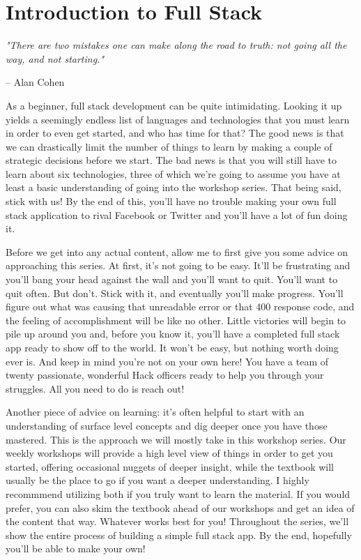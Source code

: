 \setchapterpreamble[u]{\margintoc}

\chapter{Introduction to Full Stack}

\epigraph{\emph{"There are two mistakes one can make along the road to truth: not going all the way, and not starting."}}{ -- Alan Cohen}

As a beginner, full stack development can be quite intimidating. Looking it up yields a seemingly endless list of languages and technologies that you must learn in order to even get started, and who has time for that? The good news is that we can drastically limit the number of things to learn by making a couple of strategic decisions before we start. The bad news is that you will still have to learn about six technologies, three of which we're going to assume you have at least a basic understanding of going into the workshop series. That being said, stick with us! By the end of this, you'll have no trouble making your own full stack application to rival Facebook or Twitter and you'll have a lot of fun doing it. 

Before we get into any actual content, allow me to first give you some advice on approaching this series. At first, it's not going to be easy. It'll be frustrating and you'll bang your head against the wall and you'll want to quit. You'll want to quit often. But don't. Stick with it, and eventually you'll make progress. You'll figure out what was causing that unreadable error or that 400 response code, and the feeling of accomplishment will be like no other. Little victories will begin to pile up around you and, before you know it, you'll have a completed full stack app ready to show off to the world. It won't be easy, but nothing worth doing ever is. And keep in mind you're not on your own here! You have a team of twenty passionate, wonderful Hack officers ready to help you through your struggles. All you need to do is reach out!

Another piece of advice on learning: it's often helpful to start with an understanding of surface level concepts and dig deeper once you have those mastered. This is the approach we will mostly take in this workshop series. Our weekly workshops will provide a high level view of things in order to get you started, offering occasional nuggets of deeper insight, while the textbook will usually be the place to go if you want a deeper understanding. I highly recommmend utilizing both if you truly want to learn the material. If you would prefer, you can also skim the textbook ahead of our workshops and get an idea of the content that way. Whatever works best for you! Throughout the series, we'll show the entire process of building a simple full stack app. By the end, hopefully you'll be able to make your own!

